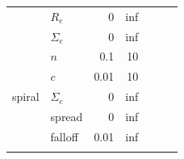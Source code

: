 \documentclass[../main.tex]{subfiles}
\begin{document}
\begin{table}
\begin{tabular}{l|l|r|r|r|r|r}
          & $R_e$      & 0              & inf            \\
          & $\Sigma_e$ & 0              & inf            \\
          & $n$        & 0.1            & 10             \\
          & $c$        & 0.01           & 10             \\
spiral    & $\Sigma_e$ & 0              & inf            \\
          & spread     & 0              & inf            \\
          & falloff    & 0.01           & inf            \\
\hline
  \centering
  \end{tabular}
  \label{table:bad_values}
\end{table}
\end{document}
